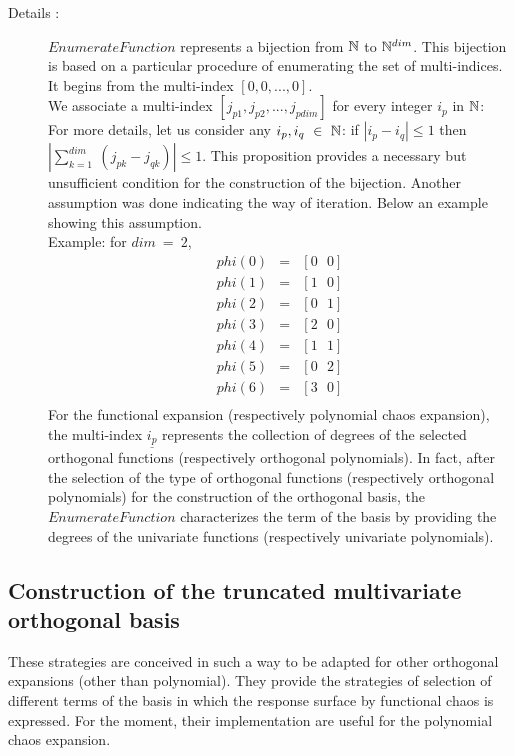 \begin{description}

\item[Details :] $EnumerateFunction$ represents a bijection from ${\mathbb N}$ to ${\mathbb N}^{dim}$. This bijection is based on a particular procedure of enumerating the set of multi-indices. It begins from the multi-index $[0,0,...,0]$. \\We associate a multi-index $[j_{p1}, j_{p2},..., j_{pdim}]$ for every integer $i_p$ in ${\mathbb N}$: \\ For more details, let us consider any $i_p, i_q~\in~{\mathbb N}$: if $|i_p-i_q|\leq 1$ then $|\sum_{k=1}^{dim}~(j_{pk}- j_{qk})| \leq 1$. This proposition provides a necessary but unsufficient condition for the construction of the bijection. Another assumption was done indicating the way of iteration. Below an example showing this assumption.\\
  Example:
  for $dim~=~2$,
  \begin{eqnarray*}
    phi(0) &=& [0~~~0] \\
    phi(1) &=& [1~~~0] \\
    phi(2) &=& [0~~~1] \\
    phi(3) &=& [2~~~0] \\
    phi(4) &=& [1~~~1] \\
    phi(5) &=& [0~~~2] \\
    phi(6) &=& [3~~~0] \\
  \end{eqnarray*}
  For the functional expansion (respectively polynomial chaos expansion), the multi-index $\underline{i_p}$ represents the collection of degrees of the selected orthogonal functions (respectively orthogonal polynomials). In fact, after the selection of the type of orthogonal functions (respectively orthogonal polynomials) for the construction of the orthogonal basis, the $EnumerateFunction$ characterizes the term of the basis by providing the degrees of the univariate functions (respectively univariate polynomials).

\end{description}


\newpage
\subsection{Construction of the truncated multivariate orthogonal basis}

These strategies are conceived in such a way to be adapted for other orthogonal expansions (other than polynomial). They provide the strategies of selection of different terms of the basis in which the response surface by functional chaos is expressed. For the moment, their implementation are useful for the polynomial chaos expansion.




